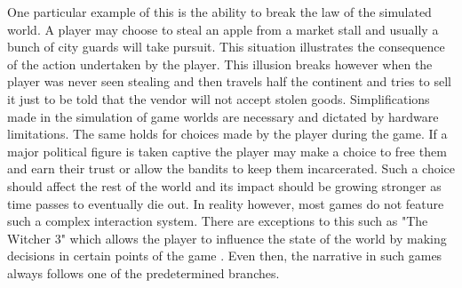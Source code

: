 One particular example of this is the ability to break the law of the simulated world.
A player may choose to steal an apple from a market stall and usually a bunch of city guards will take pursuit.
This situation illustrates the consequence of the action undertaken by the player.
This illusion breaks however when the player was never seen stealing and then travels half the continent and tries to sell it just to be told that the vendor will not accept stolen goods.
Simplifications made in the simulation of game worlds are necessary and dictated by hardware limitations.
The same holds for choices made by the player during the game.
If a major political figure is taken captive the player may make a choice to free them and earn their trust or allow the bandits to keep them incarcerated.
Such a choice should affect the rest of the world and its impact should be growing stronger as time passes to eventually die out.
In reality however, most games do not feature such a complex interaction system.
There are exceptions to this such as "The Witcher 3" which allows the player to influence the state of the world by making decisions in certain points of the game \cite{vickery2018directing}.
Even then, the narrative in such games always follows one of the predetermined branches.

